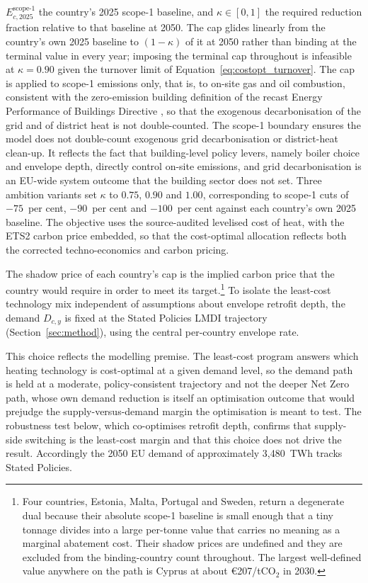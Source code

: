 $E_{c,2025}^{\text{scope-1}}$ the country's 2025 scope-1 baseline, and $\kappa\in[0,1]$
the required reduction fraction relative to that baseline at 2050. The cap glides
linearly from the country's own 2025 baseline to $(1-\kappa)$ of it at 2050 rather than
binding at the terminal value in every year; imposing the terminal cap throughout is
infeasible at $\kappa=0.90$ given the turnover limit of
Equation~\eqref{eq:costopt_turnover}. The cap is applied to scope-1
emissions only, that is, to on-site gas and oil combustion, consistent with the
zero-emission building definition of the recast Energy Performance of Buildings
Directive \citep{EPBD2024}, so that the exogenous decarbonisation of the grid and of
district heat is not double-counted. The scope-1 boundary ensures the model does not
double-count exogenous grid decarbonisation or district-heat clean-up. It reflects the
fact that building-level policy levers, namely boiler choice and envelope depth,
directly control on-site emissions, and grid decarbonisation is an EU-wide system outcome that the building sector does not set. Three ambition variants set $\kappa$ to
$0.75$, $0.90$ and $1.00$, corresponding to scope-1 cuts of $-75$~per cent, $-90$~per
cent and $-100$~per cent against each country's own 2025 baseline. The objective uses
the source-audited levelised cost of heat, with the ETS2 carbon price embedded, so that
the cost-optimal allocation reflects both the corrected techno-economics and carbon
pricing.

The shadow price of each country's cap is the implied carbon price that the country
would require in order to meet its target.\footnote{Four countries, Estonia, Malta,
Portugal and Sweden, return a degenerate dual because their absolute scope-1 baseline is
small enough that a tiny tonnage divides into a large per-tonne value that carries no
meaning as a marginal abatement cost. Their shadow prices are undefined and they are
excluded from the binding-country count throughout. The largest well-defined value
anywhere on the path is Cyprus at about \euro{}207/tCO$_2$ in 2030.} To
isolate the least-cost technology mix independent of assumptions about envelope retrofit
depth, the demand $D_{c,y}$ is fixed at the Stated Policies LMDI trajectory
(Section~\ref{sec:method}), using the central per-country envelope rate.

This choice reflects the modelling premise. The least-cost program answers which heating
technology is cost-optimal at a given demand level, so the demand path is held at a
moderate, policy-consistent trajectory and not the deeper Net Zero path, whose own
demand reduction is itself an optimisation outcome that would prejudge the
supply-versus-demand margin the optimisation is meant to test. The robustness test
below, which co-optimises retrofit depth, confirms that supply-side switching is the
least-cost margin and that this choice does not drive the result. Accordingly the 2050
EU demand of approximately 3,480~TWh tracks Stated Policies.

